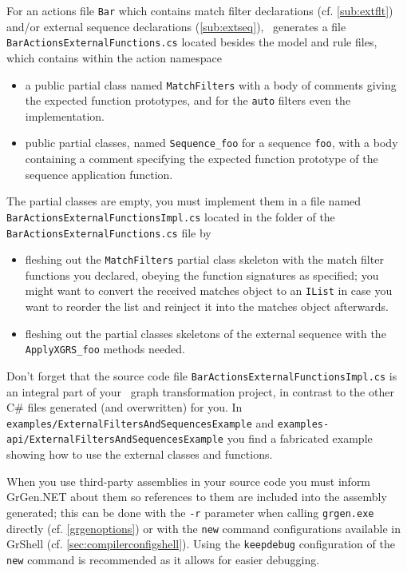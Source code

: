 For an actions file \texttt{Bar} which contains match filter declarations (cf. \ref{sub:extflt}) and/or external sequence declarations (\ref{sub:extseq}), \GrG~generates a file \texttt{BarActionsExternalFunctions.cs} located besides the model and rule files, which contains within the action namespace 
\begin{itemize}
	\item a public partial class named \texttt{MatchFilters} with a body of comments giving the expected function prototypes, and for the \texttt{auto} filters even the implementation.
	\item public partial classes, named \texttt{Sequence\_foo} for a sequence \texttt{foo}, with a body containing a comment specifying the expected function prototype of the sequence application function.
\end{itemize}

\noindent The partial classes are empty, you must implement them in a file named \texttt{BarActionsExternal\-FunctionsImpl.cs} located in the folder of the \texttt{BarActionsExternalFunctions.cs} file by
\begin{itemize}
	\item fleshing out the \texttt{MatchFilters} partial class skeleton with the match filter functions you declared, obeying the function signatures as specified; you might want to convert the received matches object to an \texttt{IList} in case you want to reorder the list and reinject it into the matches object afterwards.
	\item fleshing out the partial classes skeletons of the external sequence with the \texttt{ApplyXGRS\_foo} methods needed.
\end{itemize}

\noindent Don't forget that the source code file \texttt{BarActionsExternalFunctionsImpl.cs} is an integral part of your \GrG~graph transformation project, in contrast to the other C\# files generated (and overwritten) for you.
In \texttt{examples/ExternalFiltersAndSequencesExample} and \texttt{examples-api/ExternalFiltersAndSequencesExample}
you find a fabricated example showing how to use the external classes and functions.

When you use third-party assemblies in your source code you must inform GrGen.NET about them so references to them are included into the assembly generated; this can be done with the \texttt{-r} parameter when calling \texttt{grgen.exe} directly (cf. \ref{grgenoptions}) or with the \texttt{new} command configurations available in GrShell (cf. \ref{sec:compilerconfigshell}). Using the \texttt{keepdebug} configuration of the \texttt{new} command is recommended as it allows for easier debugging.

